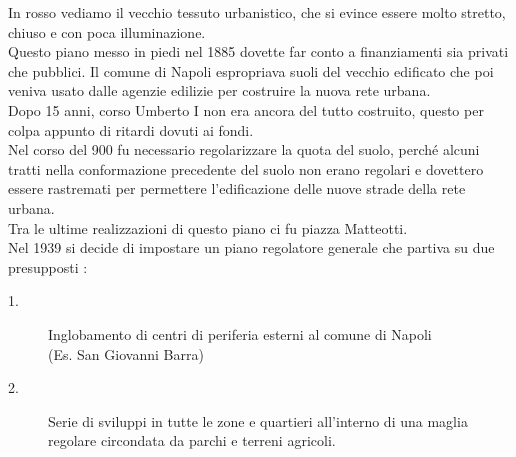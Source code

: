 \documentclass[a4paper,12pt, oneside]{book}
\begin{document}
  In rosso vediamo il vecchio tessuto urbanistico, che si evince essere molto stretto, chiuso e con poca illuminazione.\\
  Questo piano messo in piedi nel 1885 dovette far conto a finanziamenti sia privati che pubblici. Il comune di Napoli espropriava suoli del vecchio edificato che poi veniva usato dalle agenzie edilizie per costruire la nuova rete urbana.\\
  Dopo 15 anni, corso Umberto I non era ancora del tutto costruito, questo per colpa appunto di ritardi dovuti ai fondi.\\
  Nel corso del 900 fu necessario regolarizzare la quota del suolo, perché alcuni tratti nella conformazione precedente del suolo non erano regolari e dovettero essere rastremati per permettere l'edificazione delle nuove strade della rete urbana.\\
  Tra le ultime realizzazioni di questo piano ci fu piazza Matteotti.\\
  Nel 1939 si decide di impostare un piano regolatore generale che partiva su due presupposti : \\
   \begin{description}
  	\item[1.] Inglobamento di centri di periferia esterni al comune di Napoli \\(Es. San Giovanni Barra)
  	\item[2.] Serie di sviluppi in tutte le zone e quartieri all'interno di una maglia regolare circondata da parchi e terreni agricoli.
  \end{description}
\end{document}
